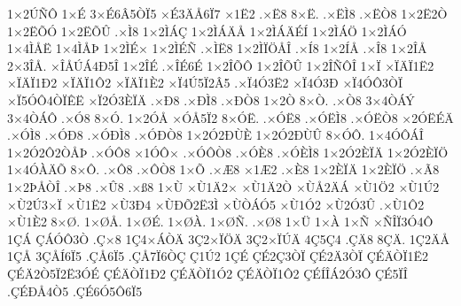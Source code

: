 {1^^d72^^da^^d1^^d4
1^^d7^^c9
3^^d7^^c96^^c25^^d2^^cf5
^^d7^^c93^^c4^^c56^^cf7
^^d71^^cb2
.^^d7^^cb8
8^^d7^^cb.
.^^d7^^cb^^cc8
.^^d7^^cb^^d28
1^^d72^^cb2^^d2
1^^d72^^cb^^d5^^d3
1^^d72^^cb^^d5^^db
.^^d7^^cc8
1^^d72^^cc^^c1^^c7
1^^d72^^cc^^c1^^c4^^c5
1^^d72^^cc^^c1^^c4^^c9^^cd
1^^d72^^cc^^c1^^d6
1^^d72^^cc^^c1^^d3
1^^d74^^cc^^c5^^cb
1^^d74^^cc^^c5^^de
1^^d72^^cc^^c9^^d7
1^^d72^^cc^^c9^^d1
.^^d7^^cc^^cb8
1^^d72^^cc^^cf^^d6^^c5^^ce
.^^d7^^cd8
1^^d72^^cd^^c5
.^^d7^^ce8
1^^d72^^ce^^c5
2^^d73^^ce^^c5.
^^d7^^ce^^c5^^da^^c14^^d05^^ce
1^^d72^^ce^^c9
.^^d7^^ce^^c96^^c9
1^^d72^^ce^^d5^^d4
1^^d72^^ce^^d5^^db
1^^d72^^ce^^d1^^d4^^ce
1^^d7^^cf
^^d7^^cf^^c4^^cf1^^cb2
^^d7^^cf^^c4^^cf1^^d02
^^d7^^cf^^c4^^cf1^^d42
^^d7^^cf^^c4^^cf1^^c82
^^d7^^cf4^^da5^^cf2^^c25
.^^d7^^cf4^^d33^^cb2
^^d7^^cf4^^d33^^d0
^^d7^^cf4^^d3^^d43^^d2^^cf
^^d7^^cf5^^d3^^d44^^d2^^cf^^ca^^cb
^^d7^^cf2^^d33^^c8^^cf^^c4
.^^d7^^d08
.^^d7^^d0^^cc8
.^^d7^^d0^^d28
1^^d72^^d2
8^^d7^^d2.
.^^d7^^d28
3^^d74^^d2^^c1^^dd
3^^d74^^d2^^c1^^d4
.^^d7^^d38
8^^d7^^d3.
1^^d72^^d3^^c5
^^d7^^d3^^c55^^cf2
8^^d7^^d3^^cb.
.^^d7^^d3^^cb8
.^^d7^^d3^^cb^^cc8
.^^d7^^d3^^cb^^d28
^^d72^^d3^^cb^^c9^^c4
.^^d7^^d3^^cc8
.^^d7^^d3^^d08
.^^d7^^d3^^d0^^cc8
.^^d7^^d3^^d0^^d28
1^^d72^^d32^^d0^^d9^^c8
1^^d72^^d32^^d0^^d9^^db
8^^d7^^d3^^d4.
1^^d74^^d3^^d4^^c1^^ce
1^^d72^^d32^^d42^^d2^^c5^^de
.^^d7^^d3^^d48
^^d71^^d3^^d4^^d7
.^^d7^^d3^^d4^^d28
.^^d7^^d3^^c88
.^^d7^^d3^^c8^^cc8
1^^d72^^d32^^c8^^cf^^c4
1^^d72^^d32^^c8^^cf^^d6
1^^d74^^d3^^c0^^c4^^d5
8^^d7^^d4.
.^^d7^^d48
.^^d7^^d4^^d28
1^^d7^^d5
.^^d7^^c68
^^d71^^c62
.^^d7^^c88
1^^d72^^c8^^cf^^c4
1^^d72^^c8^^cf^^d6
.^^d7^^c38
1^^d72^^de^^c5^^d2^^ce
.^^d7^^de8
.^^d7^^db8
.^^d7^^df8
1^^d7^^d9
^^d7^^d91^^c42^^d7
^^d7^^d91^^c42^^d2
^^d7^^d9^^c52^^c4^^c1
^^d7^^d91^^d62
^^d7^^d91^^da2
^^d7^^d92^^da3^^d7^^cf
^^d7^^d91^^cb2
^^d7^^d93^^d04
^^d7^^d9^^d0^^d52^^cb3^^cc
^^d7^^d9^^d2^^c1^^d35
^^d7^^d91^^d32
^^d7^^d92^^d33^^db
.^^d7^^d91^^d42
^^d7^^d91^^c82
8^^d7^^d8.
1^^d7^^d8^^c5.
1^^d7^^d8^^c9.
1^^d7^^d8^^c0.
1^^d7^^d8^^d1.
.^^d7^^d88
1^^d7^^dc
1^^d7^^c0
1^^d7^^d1
^^d7^^d1^^ce^^cf3^^d34^^d4
1^^c7^^c1
^^c7^^c1^^d3^^d43^^d2
.^^c7^^d78
1^^c74^^d7^^c1^^d2^^c4
3^^c72^^d7^^cf^^d6^^c4
3^^c72^^d7^^cf^^da^^c4
4^^c75^^c74
.^^c7^^c48
8^^c7^^c4.
1^^c72^^c4^^c5
1^^c7^^c5
3^^c7^^c5^^cd6^^cf5
.^^c7^^c56^^cf5
.^^c7^^c57^^cf6^^d2^^c7
^^c71^^da2
1^^c7^^c9
^^c7^^c92^^c73^^d2^^cf
^^c7^^c92^^c43^^d2^^cf
^^c7^^c9^^c4^^d2^^cf1^^cb2
^^c7^^c9^^c42^^d25^^cf2^^cb3^^d3^^c9
^^c7^^c9^^c4^^d2^^cf1^^d02
^^c7^^c9^^c4^^d2^^cf1^^d32
^^c7^^c9^^c4^^d2^^cf1^^d42
^^c7^^c9^^cd^^ce^^c12^^d33^^d4
^^c7^^c95^^cf^^ce
.^^c7^^c9^^d0^^c54^^d25
.^^c7^^c96^^d35^^d46^^cf5
}
